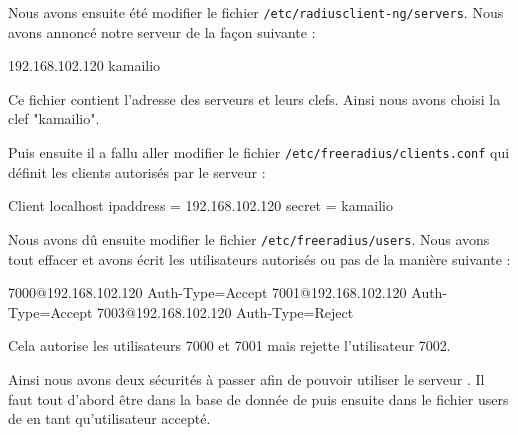 Nous avons ensuite été modifier le fichier \texttt{/etc/radiusclient-ng/servers}. Nous avons annoncé notre serveur de la façon suivante :


192.168.102.120		kamailio


Ce fichier contient l'adresse des serveurs {\rad} et leurs clefs. Ainsi nous avons choisi la clef "kamailio".

Puis ensuite il a fallu aller modifier le fichier \texttt{/etc/freeradius/clients.conf} qui définit les clients autorisés par le serveur {\frad} :

\begin{shellcode}
Client localhost
{
 ipaddress = 192.168.102.120
 secret = kamailio
}
\end{shellcode}

Nous avons dû ensuite modifier le fichier \texttt{/etc/freeradius/users}. Nous avons tout effacer et avons écrit les utilisateurs autorisés ou pas de la manière suivante :


7000@192.168.102.120 Auth-Type=Accept
7001@192.168.102.120 Auth-Type=Accept
7003@192.168.102.120 Auth-Type=Reject


Cela autorise les utilisateurs 7000 et 7001 mais rejette l'utilisateur 7002.

Ainsi nous avons deux sécurités à passer afin de pouvoir utiliser le serveur {\kam}. Il faut tout d'abord être dans la base de donnée de {\kam} puis ensuite dans le fichier users de {\frad} en tant qu'utilisateur accepté.


